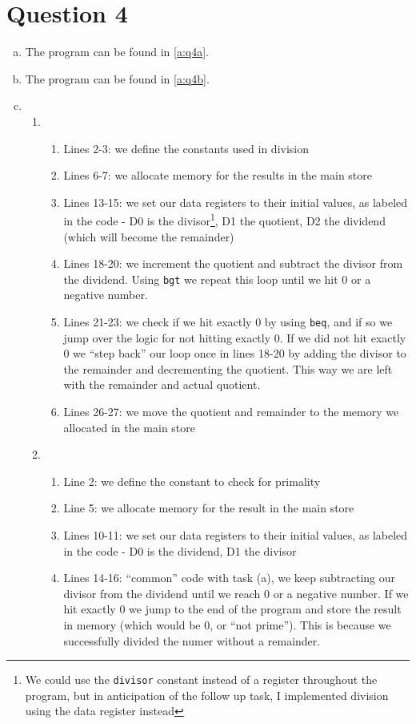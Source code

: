 \documentclass[11pt]{article} %
\begin{document}
\section*{Question 4}
\begin{enumerate}[(a)]
	\item The program can be found in \cref{a:q4a}.
	\item The program can be found in \cref{a:q4b}.
	\item \begin{enumerate}
		\item \begin{enumerate}
			\item Lines 2-3: we define the constants used in division
			\item Lines 6-7: we allocate memory for the results in the main store
			\item Lines 13-15: we set our data registers to their initial values, as labeled in the code - D0 is the divisor\footnote{We could use the \texttt{divisor} constant instead of a register throughout the program, but in anticipation of the follow up task, I implemented division using the data register instead}, D1 the quotient, D2 the dividend (which will become the remainder)
			\item Lines 18-20: we increment the quotient and subtract the divisor from the dividend. Using \texttt{\footnotesize bgt} we repeat this loop until we hit 0 or a negative number.
			\item Lines 21-23: we check if we hit exactly 0 by using \texttt{\footnotesize beq}, and if so we jump over the logic for not hitting exactly 0. If we did not hit exactly 0 we ``step back'' our loop once in lines 18-20 by adding the divisor to the remainder and decrementing the quotient. This way we are left with the remainder and actual quotient.
			\item Lines 26-27: we move the quotient and remainder to the memory we allocated in the main store
		\end{enumerate}
		\item \begin{enumerate} 
			\item Line 2: we define the constant to check for primality
			\item Line 5: we allocate memory for the result in the main store
			\item Lines 10-11: we set our data registers to their initial values, as labeled in the code - D0 is the dividend, D1 the divisor
			\item Lines 14-16: ``common'' code with task (a), we keep subtracting our divisor from the dividend until we reach 0 or a negative number. If we hit exactly 0 we jump to the end of the program and store the result in memory (which would be 0, or ``not prime''). This is because we successfully divided the numer without a remainder.

\end{enumerate}
\end{enumerate}
\end{enumerate}
\end{document}
